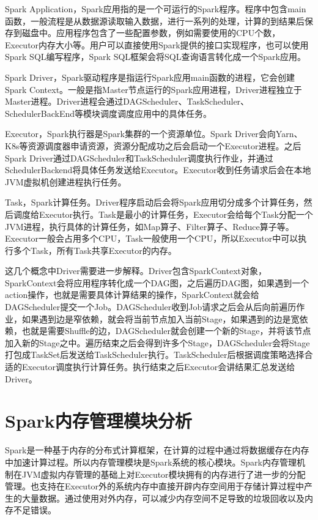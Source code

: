 Spark Application，Spark应用指的是一个可运行的Spark程序。程序中包含main函数，一般流程是从数据源读取输入数据，进行一系列的处理，计算的到结果后保存到磁盘中。应用程序包含了一些配置参数，例如需要使用的CPU个数，Executor内存大小等。用户可以直接使用Spark提供的接口实现程序，也可以使用Spark SQL编写程序，Spark SQL框架会将SQL查询语言转化成一个Spark应用。

Spark Driver，Spark驱动程序是指运行Spark应用main函数的进程，它会创建Spark Context。一般是指Master节点运行的Spark应用进程，Driver进程独立于Master进程。Driver进程会通过DAGScheduler、TaskScheduler、SchedulerBackEnd等模块调度调度应用中的具体任务。

Executor，Spark执行器是Spark集群的一个资源单位。Spark Driver会向Yarn、K8s等资源调度器申请资源，资源分配成功之后会启动一个Executor进程。之后Spark Driver通过DAGScheduler和TaskScheduler调度执行作业，并通过SchedulerBackend将具体任务发送给Executor。Executor收到任务请求后会在本地JVM虚拟机创建进程执行任务。

Task，Spark计算任务。Driver程序启动后会将Spark应用切分成多个计算任务，然后调度给Executor执行。Task是最小的计算任务，Executor会给每个Task分配一个JVM进程，执行具体的计算任务，如Map算子、Filter算子、Reduce算子等。Executor一般会占用多个CPU，Task一般使用一个CPU，所以Executor中可以执行多个Task，所有Task共享Executor的内存。

这几个概念中Driver需要进一步解释。Driver包含SparkContext对象，SparkContext会将应用程序转化成一个DAG图，之后遍历DAG图，如果遇到一个action操作，也就是需要具体计算结果的操作，SparkContext就会给DAGScheduler提交一个Job。DAGScheduler收到Job请求之后会从后向前遍历作业，如果遇到边是窄依赖，就会将当前节点加入当前Stage，如果遇到的边是宽依赖，也就是需要Shuffle的边，DAGScheduler就会创建一个新的Stage，并将该节点加入新的Stage之中。遍历结束之后会得到许多个Stage，DAGScheduler会将Stage打包成TaskSet后发送给TaskScheduler执行。TaskScheduler后根据调度策略选择合适的Executor调度执行计算任务。执行结束之后Executor会讲结果汇总发送给Driver。


\section{Spark内存管理模块分析}

Spark是一种基于内存的分布式计算框架，在计算的过程中通过将数据缓存在内存中加速计算过程。所以内存管理模块是Spark系统的核心模块。Spark内存管理机制在JVM虚拟内存管理的基础上对Executor模块拥有的内存进行了进一步的分配管理。也支持在Executor外的系统内存中直接开辟内存空间用于存储计算过程中产生的大量数据。通过使用对外内存，可以减少内存空间不足导致的垃圾回收以及内存不足错误。

